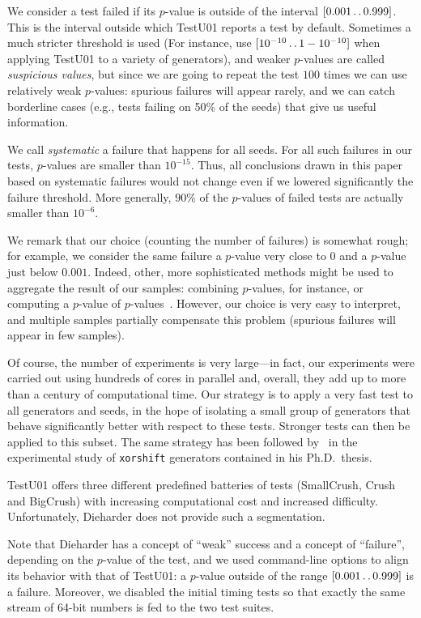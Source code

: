\documentclass{acmsmalltr}
\def\..{\,\mathpunct{\ldotp\ldotp}}
\newcommand{\xorshift}[1][]{\texttt{xorshift#1}\xspace}
\begin{document}
We consider a test failed if its $p$-value is outside of the interval
$[0.001\..0.999]$. This is the interval outside which TestU01 reports a test by
default.
Sometimes a much stricter threshold is used (For instance,
 use $[10^{-10}\..1-10^{-10}]$ when applying TestU01 to 
a variety of generators), and weaker $p$-values are called \emph{suspicious
values}, but since we are going to repeat the
test $100$ times we can use relatively weak $p$-values: spurious failures will
appear rarely, and we can catch borderline cases (e.g., tests failing on 50\% of
the seeds) that give us useful information. 

We call \emph{systematic} a failure that happens for all seeds. For all such
failures in our tests, $p$-values are smaller than $10^{-15}$. Thus, all
conclusions drawn in this paper based on systematic failures would not change
even if we lowered significantly the failure threshold. More generally, $90$\%
of the $p$-values of failed tests are actually smaller than $10^{-6}$.

We remark that our choice (counting the number of failures) is somewhat rough;
for example, we consider the same failure a $p$-value very close to $0$ and a
$p$-value just below $0.001$. Indeed, other, more sophisticated methods might be
used to aggregate the result of our samples: combining $p$-values, for instance,
or computing a $p$-value of $p$-values~\cite{RSNSTSRPNGCA}.
However, our choice is very easy to interpret, and multiple samples partially
compensate this problem (spurious failures will appear in few samples).

Of course, the number of experiments is very large---in fact, our experiments
were carried out using hundreds of cores in parallel and, overall, they add up
to more than a century of computational time. Our strategy is to apply a very fast
test to all generators and seeds, in the hope of isolating a small group of
generators that behave significantly better with respect to these tests.
Stronger tests can then be applied to this subset. The same strategy has been followed by~ in the experimental study
of \xorshift generators contained in his Ph.D.~thesis.

TestU01 offers three different predefined batteries of tests (SmallCrush, Crush
and BigCrush) with increasing computational cost and increased difficulty.
Unfortunately, Dieharder does not provide such a segmentation.

Note that Dieharder has a concept of ``weak'' success and a concept of ``failure'',
depending on the $p$-value of the test, and we used command-line options to align
its behavior with that of TestU01: a $p$-value outside of the range
$[0.001\..0.999]$ is a failure. Moreover, we disabled the initial timing tests so
that exactly the same stream of 64-bit numbers is fed to the two test suites.
\end{document}
